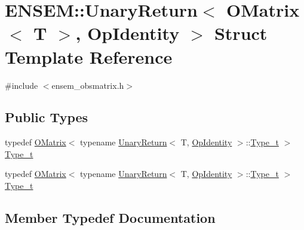 \hypertarget{structENSEM_1_1UnaryReturn_3_01OMatrix_3_01T_01_4_00_01OpIdentity_01_4}{}\section{E\+N\+S\+EM\+:\+:Unary\+Return$<$ O\+Matrix$<$ T $>$, Op\+Identity $>$ Struct Template Reference}
\label{structENSEM_1_1UnaryReturn_3_01OMatrix_3_01T_01_4_00_01OpIdentity_01_4}


{\ttfamily \#include $<$ensem\+\_\+obsmatrix.\+h$>$}

\subsection*{Public Types}
\begin{DoxyCompactItemize}
\item 
typedef \mbox{\hyperlink{classENSEM_1_1OMatrix}{O\+Matrix}}$<$ typename \mbox{\hyperlink{structENSEM_1_1UnaryReturn}{Unary\+Return}}$<$ T, \mbox{\hyperlink{structENSEM_1_1OpIdentity}{Op\+Identity}} $>$\+::\mbox{\hyperlink{structENSEM_1_1UnaryReturn_3_01OMatrix_3_01T_01_4_00_01OpIdentity_01_4_a7f4dcdf040c4857ee984e5fbf4813fc6}{Type\+\_\+t}} $>$ \mbox{\hyperlink{structENSEM_1_1UnaryReturn_3_01OMatrix_3_01T_01_4_00_01OpIdentity_01_4_a7f4dcdf040c4857ee984e5fbf4813fc6}{Type\+\_\+t}}
\item 
typedef \mbox{\hyperlink{classENSEM_1_1OMatrix}{O\+Matrix}}$<$ typename \mbox{\hyperlink{structENSEM_1_1UnaryReturn}{Unary\+Return}}$<$ T, \mbox{\hyperlink{structENSEM_1_1OpIdentity}{Op\+Identity}} $>$\+::\mbox{\hyperlink{structENSEM_1_1UnaryReturn_3_01OMatrix_3_01T_01_4_00_01OpIdentity_01_4_a7f4dcdf040c4857ee984e5fbf4813fc6}{Type\+\_\+t}} $>$ \mbox{\hyperlink{structENSEM_1_1UnaryReturn_3_01OMatrix_3_01T_01_4_00_01OpIdentity_01_4_a7f4dcdf040c4857ee984e5fbf4813fc6}{Type\+\_\+t}}
\end{DoxyCompactItemize}


\subsection{Member Typedef Documentation}
\mbox{\label{structENSEM_1_1UnaryReturn_3_01OMatrix_3_01T_01_4_00_01OpIdentity_01_4_a7f4dcdf040c4857ee984e5fbf4813fc6}} 
